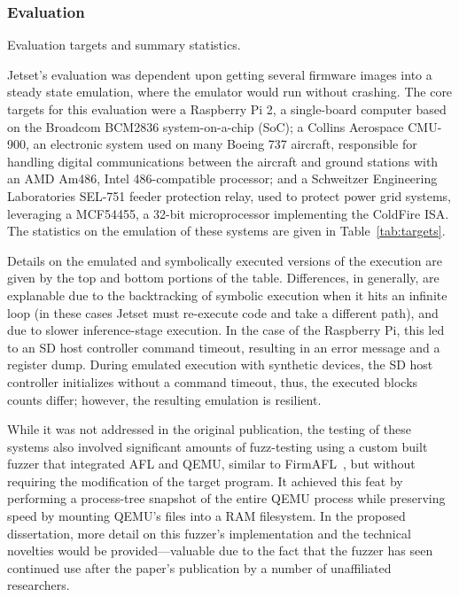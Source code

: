 \subsubsection{Evaluation}



\begin{table*}
\small
\centering
\caption{Evaluation targets and summary statistics.}
\label{tab:targets}

\vspace{\baselineskip} %
\end{table*}

Jetset's evaluation was dependent upon getting several firmware images into a steady state emulation, where the emulator would run without crashing.
The core targets for this evaluation were a Raspberry Pi 2, a single-board computer based on the Broadcom BCM2836 system-on-a-chip (SoC); a Collins Aerospace CMU-900, an electronic system used on many Boeing 737 aircraft, responsible for handling digital communications between the aircraft and ground stations with an AMD Am486, Intel 486-compatible processor; and a Schweitzer Engineering Laboratories SEL-751 feeder protection relay, used to protect power grid systems, leveraging a MCF54455, a 32-bit microprocessor implementing the ColdFire ISA.
The statistics on the emulation of these systems are given in Table~\ref{tab:targets}.

Details on the emulated and symbolically executed versions of the execution are given by the top and bottom portions of the table. 
Differences, in generally, are explanable due to the backtracking of symbolic execution when it hits an infinite loop (in these cases Jetset must re-execute code and take a different path), and due to slower inference-stage execution.
In the case of the Raspberry Pi, this led to an SD host controller command timeout, resulting in an error message and a register dump. 
During emulated execution with synthetic devices, the SD host controller initializes without a command timeout, thus, the executed blocks counts differ; however, the resulting emulation is resilient. 

While it was not addressed in the original publication, the testing of these systems also involved significant amounts of fuzz-testing using a custom built fuzzer that integrated AFL and QEMU, similar to FirmAFL~\cite{zheng2019firm}, but without requiring the modification of the target program.
It achieved this feat by performing a process-tree snapshot of the entire QEMU process while preserving speed by mounting QEMU's files into a RAM filesystem.
In the proposed dissertation, more detail on this fuzzer's implementation and the technical novelties would be provided---valuable due to the fact that the fuzzer has seen continued use after the paper's publication by a number of unaffiliated researchers.

